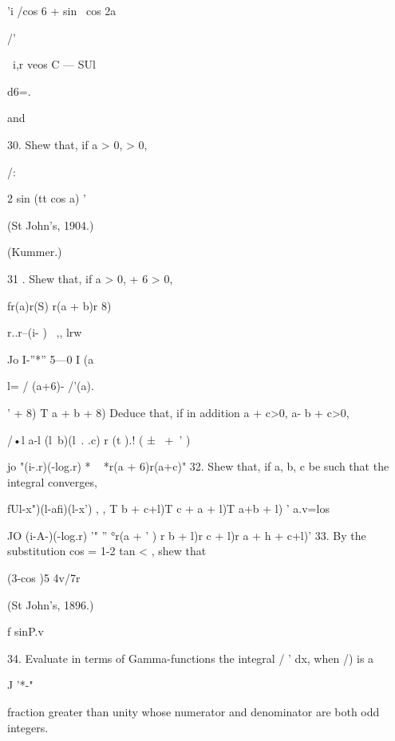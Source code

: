 'i /cos 6 + sin \ cos 2a



/'



\ i,r veos C — SUl



d6=.



and



30. Shew that, if a > 0, > 0,



/:



2 sin (tt cos a) '






(St John's, 1904.)



(Kummer.)



31 . Shew that, if a > 0, + 6 > 0,

fr(a)r(S) r(a + b)r 8)



r..r--(i- ) \ ,, lrw

Jo I-''*'' 5—0 I (a



l= / (a+6)- /'(a).



' + 8) T a + b + 8) Deduce that, if in addition a + c>0, a- b + c>0,

/•l a-l (l\ b)(l\ . .c) r (t ).! ( ± \ +\ ' )

jo "(i-.r)(-log.r) * ~ *r(a + 6)r(a+c)" 32. Shew that, if a, b, c be
such that the integral converges,

fUl-x")(l-afi)(l-x') , , T b + c+l)T c + a + l)T a+b + l) ' a.v=los



JO (i-A-)(-log.r) '" '' °r(a + ' ) r b + l)r c + l)r a + h + c+l)' 33.
By the substitution cos = 1-2 tan < , shew that

(3-cos )5 4v/7r



(St John's, 1896.)



f sinP.v

34. Evaluate in terms of Gamma-functions the integral / ' dx, when /)
is a

J '*-"

fraction greater than unity whose numerator and denominator are both
odd integers.

